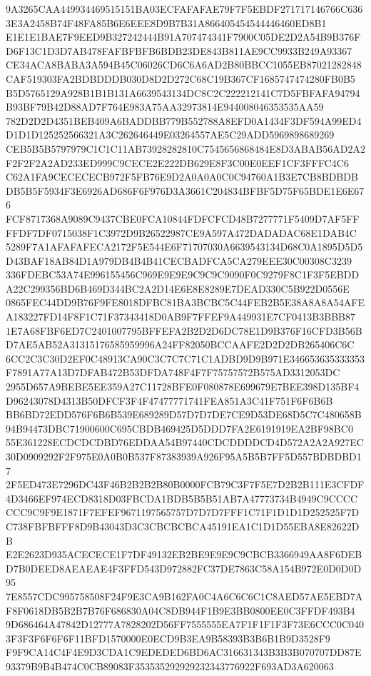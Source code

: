 \documentclass[UTF8,fontset=fandol,zihao=-4,a4paper]{ctexart}
\begin{document}
{{9A3265CAA449934469515151BA03ECFAFAFAE79F7F5EBDF271717146766C6363E3A2458B74F48FA85B6E6EEE8D9B7B31A866405454544446460ED8B1
E1E1E1BAE7F9EED9B327242444B91A707474341F7900C05DE2D2A54B9B376FD6F13C1D3D7AB478FAFBFBFB6BDB23DE843B811AE9CC9933B249A93367
CE34ACA8BABA3A594B45C06026CD6C6A6AD2B80BBCC1055EB87021282848CAF519303FA2BDBDDDB030D8D2D272C68C19B367CF1685747474280FB0B5
B5D5765129A928B1B1B131A6639543134DC8C2C222212141C7D5FBFAFA94794B93BF79B42D88AD7F764E983A75AA32973814E944008046353535AA59
782D2D2D4351BEB409A6BADDBB779B552788A8EFD0A1434F3DF594A99ED4D1D1D125252566321A3C262646449E03264557AE5C29ADD5969898689269
CEB5B5B5797979C1C1C11AB73928282810C7545656868484E8D3ABAB56AD2A2F2F2F2A2AD233ED999C9CECE2E222DB629E8F3C00E0EEF1CF3FFFC4C6
C62A1FA9CECECECB972F5FB76E9D2A0A0A0C0C94760A1B3E7CB8BDBDBDB5B5F5934F3E6926AD686F6F976D3A3661C204834BFBF5D75F65BDE1E6E676
FCF8717368A9089C9437CBE0FCA10844FDFCFCD48B7277771F5409D7AF5FFFFDF7DF0715038F1C3972D9B26522987CE9A597A472DADADAC68E1DAB4C
5289F7A1AFAFAFECA2172F5E544E6F71707030A6639543134D68C0A1895D5D5D43BAF18AB84D1A979DB4B4B41CECBADFCA5CA279EEE30C00308C3239
336FDEBC53A74E996155456C969E9E9E9C9C9C9090F0C9279F8C1F3F5EBDDA22C299356BD6B469D344BC2A2D14E6E8E8289E7DEAD330C5B922D0556E
0865FEC44DD9B76F9FE8018DFBC81BA3BCBC5C44FEB2B5E38A8A8A54AFEA183227FD14F8F1C71F37343418D0AB9F7FFEF9A449931E7CF0413B3BBB87
1E7A68FBF6ED7C2401007795BFFEFA2B2D2D6DC78E1D9B376F16CFD3B56BD7AE5AB52A31315176585959996A24FF82050BCCAAFE2D2D2DB265406C6C
6CC2C3C30D2EF0C48913CA90C3C7C7C71C1ADBD9D9B971E346653635333353F7891A77A13D7DFAB472B53DFDA748F4F7F75757572B575AD3312053DC
2955D657A9BEBE5EE359A27C11728BFE0F080878E699679E7BEE398D135BF4D96243078D4313B50DFCF3F4F47477771741FEA851A3C41F751F6F6B6B
BB6BD72EDD576F6B6B539E689289D57D7D7DE7CE9D53DE68D5C7C480658B94B94473DBC71900600C695CBDB469425D5DDD7FA2E6191919EA2BF98BC0
55E361228ECDCDCDBD76EDDAA54B97440CDCDDDDCD4D572A2A2A927EC30D0909292F2F975E0A0B0B537F87383939A926F95A5B5B7FF5D557BDBDBD17
2F5ED473E7296DC43F46B2B2B2B80B0000FCB79C3F7F5E7D2B2B111E3CFDF4D3466EF974ECD8318D03FBCDA1BDB5B5B51AB7A47773734B4949C9CCCC
CCC9C9F9E1871F7EFEF9671197565757D7D7D7FFF1C71F1D1D1D252525F7DC738FBFBFFF8D9B43043D3C3CBCBCBCA45191EA1C1D1D55EBA8E82622DB
E2E2623D935ACECECE1F7DF49132EB2BE9E9E9C9CBCB3366949AA8F6DEBD7B0DEED8AEAEAE4F3FFD543D972882FC37DE7863C58A154B972E0D0D0D95
7E8557CDC995758508F24F9E3CA9B162FA0C4A6C6C6C1C8AED57AE5EBD7AF8F0618DB5B2B7B76F686830A04C8DB944F1B9E3BB0800EE0C3FFDF493B4
9D686464A47842D12777A7828202D56FF7555555EA7F1F1F1F3F73E6CCC0C0403F3F3F6F6F6F11BFD1570000E0ECD9B3EA9B58393B3B6B1B9D3528F9
F9F9CA14C4F4E9D3CDA1C9EDEDED6BD6AC316631343B3B3B070707DD87E93379B9B4B474C0CB89083F353535292929232343776922F693AD3A620063
}}
\end{document}

